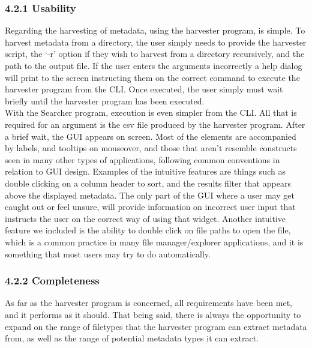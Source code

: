 \documentclass[11pt]{article}
\begin{document}
\begin{adjustwidth}{1cm}{}

\subsubsection{4.2.1 Usability}
Regarding the harvesting of metadata, using the harvester program, is simple. To harvest metadata from a directory, the user simply needs to provide the harvester script, the ‘-r’ option if they wish to harvest from a directory recursively, and the path to the output file. If the user enters the arguments incorrectly a help dialog will print to the screen instructing them on the correct command to execute the harvester program from the CLI. Once executed, the user simply must wait briefly until the harvester program has been executed. \\

With the Searcher program, execution is even simpler from the CLI. All that is required for an argument is the csv file produced by the harvester program. After a brief wait, the GUI appears on screen. Most of the elements are accompanied by labels, and tooltips on mouseover, and those that aren’t resemble constructs seen in many other types of applications, following common conventions in relation to GUI design. Examples of the intuitive features are things such as double clicking on a column header to sort, and the results filter that appears above the displayed metadata. The only part of the GUI where a user may get caught out or feel unsure, will provide information on incorrect user input that instructs the user on the correct way of using that widget. Another intuitive feature we included is the ability to double click on file paths to open the file, which is a common practice in many file manager/explorer applications, and it is something that most users may try to do automatically. \\

\subsubsection{4.2.2 Completeness}
As far as the harvester program is concerned, all requirements have been met, and it performs as it should. That being said, there is always the opportunity to expand on the range of filetypes that the harvester program can extract metadata from, as well as the range of potential metadata types it can extract. \\


\end{adjustwidth}
\end{document}
